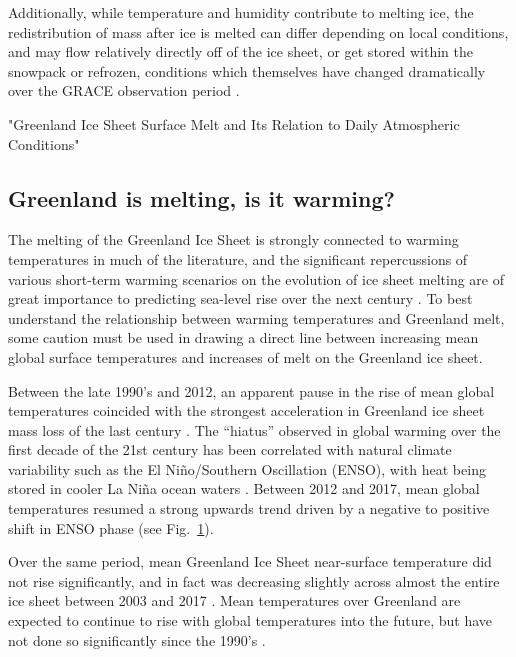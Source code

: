 \documentclass[11pt]{report}
\begin{document}
Additionally, while temperature and humidity contribute to melting ice, the redistribution of mass after ice is melted can differ depending on local conditions, and may flow relatively directly off of the ice sheet, or get stored within the snowpack or refrozen, conditions which themselves have changed dramatically over the GRACE observation period \cite[][]{angelen2014,pena2015}. 




"Greenland Ice Sheet Surface Melt and Its Relation to Daily Atmospheric Conditions"

\subsection{Greenland is melting, is it warming?}
The melting of the Greenland Ice Sheet is strongly connected to warming temperatures in much of the literature, and the significant repercussions of various short-term warming scenarios on the evolution of ice sheet melting are of great importance to predicting sea-level rise over the next century \cite[][]{hahn2018,pattyn2018,ruckamp2018}. To best understand the relationship between warming temperatures and Greenland melt, some caution must be used in drawing a direct line between increasing mean global surface temperatures and increases of melt on the Greenland ice sheet. 

Between the late 1990's and 2012, an apparent pause in the rise of mean global temperatures coincided with the strongest acceleration in Greenland ice sheet mass loss of the last century \cite[][]{kosaka2013,angelen2014,bevis2019}. The ``hiatus'' observed in global warming over the first decade of the 21st century has been correlated with natural climate variability such as the El Ni\~{n}o/Southern Oscillation (ENSO), with heat being stored in cooler La Ni\~{n}a ocean waters \cite[][]{kosaka2013}. Between 2012 and 2017, mean global temperatures resumed a strong upwards trend driven by a negative to positive shift in ENSO phase (see Fig.~\ref{fig:ENSO}).

\begin{figure}[h]
\centering
{}
\caption[]{} \label{fig:ENSO}
\end{figure}

Over the same period, mean Greenland Ice Sheet near-surface temperature did not rise significantly, and in fact was decreasing slightly across almost the entire ice sheet between 2003 and 2017 \cite[see Figs.~\ref{fig:ENSO}~\&~\ref{fig:Tslope}, and ][]{hearty2018, westergaard2018,reeves2017}. Mean temperatures over Greenland are expected to continue to rise with global temperatures into the future, but have not done so significantly since the 1990's \cite[][]{reeves2017}. 
\end{document}
